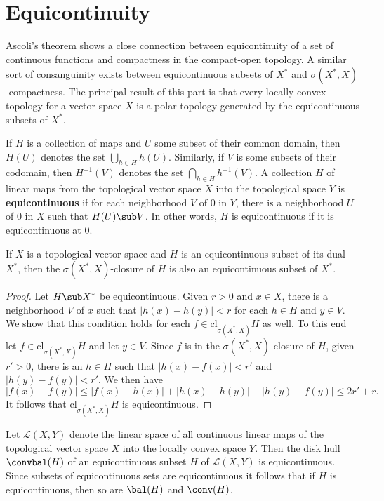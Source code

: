 \section{Equicontinuity}
Ascoli's theorem shows a close connection between equicontinuity of a set of continuous functions and compactness in the compact-open topology. A similar sort of consanguinity exists between equicontinuous subsets of $X^*$ and $\sigma(X^*,X)$-compactness. The principal result of this part is that every locally convex topology for a vector space $X$ is a polar topology generated by the equicontinuous subsets of $X^*$.\par
If $H$ is a collection of maps and $U$ some subset of their common domain, then $H(U)$ denotes the set $\bigcup_{h\in H}h(U)$. Similarly, if $V$ is some subsets of their codomain, then $H^{-1}(V)$ denotes the set $\bigcap_{h\in H}h^{-1}(V)$. A collection $H$ of linear maps from the topological vector space $X$ into the topological space $Y$ is \textbf{equicontinuous} if for each neighborhood $V$ of $0$ in $Y$, there is a neighborhood $U$ of $0$ in $X$ such that $H(U)\sub V$. In other words, $H$ is equicontinuous if it is equicontinuous at $0$.
\begin{proposition}\label{equicontinuous weak closure}
If $X$ is a topological vector space and $H$ is an equicontinuous subset of its dual $X^*$, then the $\sigma(X^*,X)$-closure of $H$ is also an equicontinuous subset of $X^*$.
\end{proposition}
\begin{proof}
Let $H\sub X^*$ be equicontinuous. Given $r>0$ and $x\in X$, there is a neighborhood $V$ of $x$ such that $|h(x)-h(y)|<r$ for each $h\in H$ and $y\in V$. We show that this condition holds for each $f\in\mathrm{cl}_{\sigma(X^*,X)}H$ as well. To this end let $f\in\mathrm{cl}_{\sigma(X^*,X)}H$ and let $y\in V$. Since $f$ is in the $\sigma(X^*,X)$-closure of $H$, given $r'>0$, there is an $h\in H$ such that $|h(x)-f(x)|<r'$ and $|h(y)-f(y)|<r'$. We then have
\[|f(x)-f(y)|\leq|f(x)-h(x)|+|h(x)-h(y)|+|h(y)-f(y)|\leq 2r'+r.\]
It follows that $\mathrm{cl}_{\sigma(X^*,X)}H$ is equicontinuous.
\end{proof}
\begin{proposition}\label{equicontinuous convbal hull}
Let $\mathcal{L}(X,Y)$ denote the linear space of all continuous linear maps of the topological vector space $X$ into the locally convex space $Y$. Then the disk hull $\convbal(H)$ of an equicontinuous subset $H$ of $\mathcal{L}(X,Y)$ is equicontinuous. Since subsets of equicontinuous sets are equicontinuous it follows that if $H$ is equicontinuous, then so are $\bal(H)$ and $\conv(H)$.
\end{proposition}
